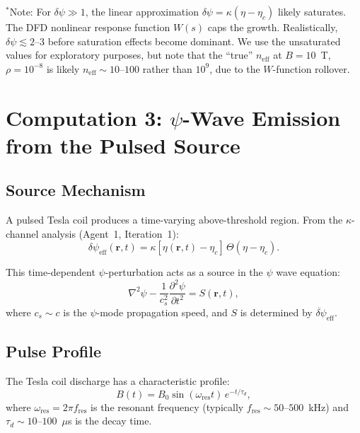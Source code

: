 \documentclass[11pt,a4paper]{article}
\begin{document}
$^*$Note: For $\delta\psi \gg 1$, the linear approximation $\delta\psi = \kappa(\eta - \eta_c)$
likely saturates. The DFD nonlinear response function $W(s)$ caps the growth.
Realistically, $\delta\psi \lesssim 2$--$3$ before saturation effects become dominant.
We use the unsaturated values for exploratory purposes, but note that the
``true'' $n_{\mathrm{eff}}$ at $B = 10$~T, $\rho = 10^{-8}$ is likely
$n_{\mathrm{eff}} \sim 10$--$100$ rather than $10^9$, due to the $W$-function rollover.

\section{Computation 3: $\psi$-Wave Emission from the Pulsed Source}\label{sec:psiwave}

\subsection{Source Mechanism}

A pulsed Tesla coil produces a time-varying above-threshold region. From the
$\kappa$-channel analysis (Agent~1, Iteration~1):
\begin{equation}
\delta\psi_{\mathrm{eff}}(\mathbf{r},t) = \kappa[\eta(\mathbf{r},t) - \eta_c]
\,\Theta(\eta - \eta_c).
\end{equation}

This time-dependent $\psi$-perturbation acts as a source in the $\psi$ wave equation:
\begin{equation}
\nabla^2\psi - \frac{1}{c_s^2}\frac{\partial^2\psi}{\partial t^2} = S(\mathbf{r},t),
\end{equation}
where $c_s \sim c$ is the $\psi$-mode propagation speed, and $S$ is determined by
$\ddot{\delta\psi}_{\mathrm{eff}}$.

\subsection{Pulse Profile}

The Tesla coil discharge has a characteristic profile:
\begin{equation}
B(t) = B_0 \sin(\omega_{\mathrm{res}} t)\,e^{-t/\tau_d},
\end{equation}
where $\omega_{\mathrm{res}} = 2\pi f_{\mathrm{res}}$ is the resonant frequency
(typically $f_{\mathrm{res}} \sim 50$--$500$~kHz) and $\tau_d \sim 10$--$100$~$\mu$s
is the decay time.
\end{document}
